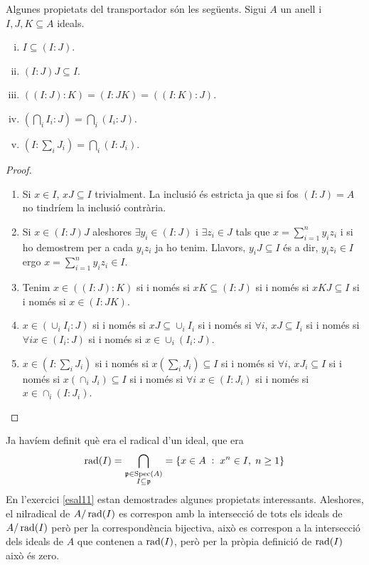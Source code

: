 \documentclass[../../../main.tex]{subfiles}
\begin{document}
\begin{prop}
\label{prop:propietatsTransportador}\label{exercici12} Algunes propietats del transportador són les següents. Sigui $A$ un anell i $I,J,K\subseteq A$ ideals. 
\begin{enumerate}[(i)]
    \item $I\subseteq (I:J)$.
    \item $(I:J)J\subseteq I$.
    \item $((I:J):K) = (I:JK)=((I:K):J)$.
    \item $\left(\bigcap_iI_i:J\right) = \bigcap_i(I_i:J)$.
    \item $\left(I:\sum_iJ_i\right) = \bigcap_i(I:J_i)$.
\end{enumerate}
\end{prop}
\begin{proof}
\begin{enumerate}
    \item Si $x\in I$, $xJ\subseteq I$ trivialment. La inclusió és estricta ja que si fos $(I:J)=A$ no tindríem la inclusió contrària.
    \item Si $x\in (I:J)J$ aleshores $\exists y_i\in (I:J)$ i $\exists z_i\in J$ tals que $x = \sum_{i=1}^ny_iz_i$ i si ho demostrem per a cada $y_iz_i$ ja ho tenim. Llavors, $y_iJ\subseteq I$ és a dir, $y_iz_i\in I$ ergo $x = \sum_{i=1}^ny_iz_i\in I$.
    \item Tenim $x\in ((I:J):K)$ si i només si $xK\subseteq (I:J)$ si i només si $xKJ\subseteq I$ si i només si $x\in (I:JK)$.
    \item $x\in (\cup_i I_i:J)$ si i només si $xJ\subseteq \cup_i I_i$ si i només si $\forall i$, $xJ\subseteq I_i$ si i només si $\forall i x\in (I_i:J)$ si i només si $x\in\cup_i(I_i:J)$.
    \item $x\in (I:\sum_iJ_i)$ si i només si $x(\sum_iJ_i)\subseteq I$ si i només si $\forall i$, $xJ_i\subseteq I$ si i només si $x(\cap_i J_i)\subseteq I$ si i només si $\forall i$ $x\in (I:J_i)$ si i només si $x\in \cap_i(I:J_i)$.
\end{enumerate} 
\end{proof}



Ja havíem definit què era el radical d'un ideal, que era
\begin{equation}
    \notag
    \operatorname{\mathrm{rad}}(I) = \bigcap_{\substack{\mathfrak{p}\in\mathrm{Spec}(A)\\I\subseteq\mathfrak{p}}} = \{x\in A\;:\;x^n\in I,\;n\geq 1\} 
\end{equation}
En l'exercici \ref{esal11} estan demostrades algunes propietats interessants. Aleshores, el nilradical de $A/\operatorname{\mathrm{rad}}(I)$ es correspon amb la intersecció de tots els ideals de $A/\operatorname{\mathrm{rad}}(I)$ però per la correspondència bijectiva, això es correspon a la intersecció dels ideals de $A$ que contenen a $\operatorname{\mathrm{rad}}(I)$, però per la pròpia definició de $\operatorname{\mathrm{rad}}(I)$ això és zero.
\end{document}
